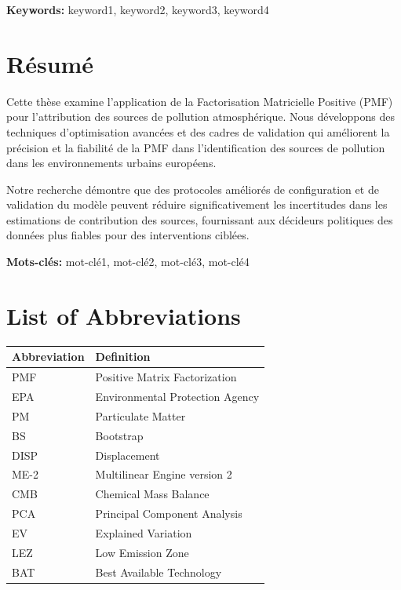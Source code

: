 \documentclass[
  letterpaper,
  oneside,
  openany]{MastersDoctoralThesis}
\theoremstyle{plain}
\theoremstyle{remark}
\begin{document}
\textbf{Keywords:} keyword1, keyword2, keyword3, keyword4


\chapter*{Résumé}\label{ruxe9sumuxe9}


Cette thèse examine l'application de la Factorisation Matricielle
Positive (PMF) pour l'attribution des sources de pollution
atmosphérique. Nous développons des techniques d'optimisation avancées
et des cadres de validation qui améliorent la précision et la fiabilité
de la PMF dans l'identification des sources de pollution dans les
environnements urbains européens.

Notre recherche démontre que des protocoles améliorés de configuration
et de validation du modèle peuvent réduire significativement les
incertitudes dans les estimations de contribution des sources,
fournissant aux décideurs politiques des données plus fiables pour des
interventions ciblées.

\textbf{Mots-clés:} mot-clé1, mot-clé2, mot-clé3, mot-clé4

\clearpage
\begingroup
\hypersetup{linkcolor=blue}
\tableofcontents
\cleardoublepage
\listoffigures
\cleardoublepage
\listoftables
\endgroup

\cleardoublepage


\chapter*{List of Abbreviations}\label{list-of-abbreviations}


\begin{longtable}[]{@{}ll@{}}
\toprule\noalign{}
Abbreviation & Definition \\
\midrule\noalign{}
\endhead
\bottomrule\noalign{}
\endlastfoot
PMF & Positive Matrix Factorization \\
EPA & Environmental Protection Agency \\
PM & Particulate Matter \\
BS & Bootstrap \\
DISP & Displacement \\
ME-2 & Multilinear Engine version 2 \\
CMB & Chemical Mass Balance \\
PCA & Principal Component Analysis \\
EV & Explained Variation \\
LEZ & Low Emission Zone \\
BAT & Best Available Technology \\
\end{longtable}
\end{document}
